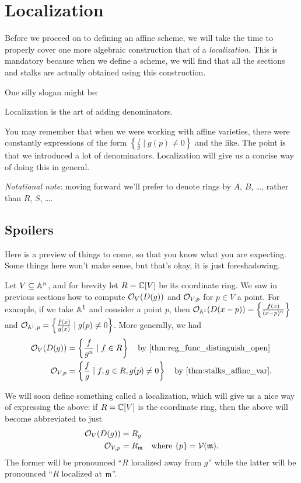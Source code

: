 \chapter{Localization}
Before we proceed on to defining an affine scheme,
we will take the time to properly cover one more algebraic construction
that of a \emph{localization}.
This is mandatory because when we define a scheme,
we will find that all the sections and stalks
are actually obtained using this construction.

One silly slogan might be:
\begin{moral}
	Localization is the art of adding denominators.
\end{moral}
You may remember that when we were working with affine varieties,
there were constantly expressions of the form
$\left\{ \frac{f}{g} \mid g(p) \ne 0 \right\}$
and the like.
The point is that we introduced a lot of denominators.
Localization will give us a concise way of doing this in general.

\emph{Notational note}:
moving forward we'll prefer to denote rings by $A$, $B$, \dots,
rather than $R$, $S$, \dots.

\section{Spoilers}
Here is a preview of things to come,
so that you know what you are expecting.
Some things here won't make sense,
but that's okay, it is just foreshadowing.

Let $V \subseteq \mathbb A^n$, and for brevity let $R = \mathbb C[V]$ be its coordinate ring.
We saw in previous sections how to compute $\mathcal O_V(D(g))$
and $\mathcal O_{V, p}$ for $p \in V$ a point.
For example, if we take $\mathbb A^1$ and consider a point $p$, then
$\mathcal O_{\mathbb A^1}(D(x-p)) = \left\{ \frac{f(x)}{(x-p)^n} \right\}$
and $\mathcal O_{\mathbb A^1, p} = \left\{ \frac{f(x)}{g(x)} \mid g(p) \ne 0 \right\}$.
More generally, we had
\begin{align*}
	\OO_{V}(D(g)) &= \left\{ \frac{f}{g^n} \mid f \in R \right\}
		\quad\text{by \Cref{thm:reg_func_distinguish_open}} \\
	\OO_{V,p} &= \left\{ \frac{f}{g} \mid f,g \in R, g(p) \ne 0 \right\}
		\quad\text{by \Cref{thm:stalks_affine_var}}.
\end{align*}

We will soon define something called a localization,
which will give us a nice way of expressing the above:
if $R = \mathbb C[V]$ is the coordinate ring, then
the above will become abbreviated to just
\begin{align*}
	\mathcal O_{V}(D(g)) &= R_{g} \\
	\mathcal O_{V, p} &= R_{\mathfrak m} \quad \text{where } \{p\} = \mathcal V(\mathfrak m).
\end{align*}
The former will be pronounced 
``$R$ localized away from $g$''
while the latter will be pronounced
``$R$ localized at $\mathfrak m$''.

